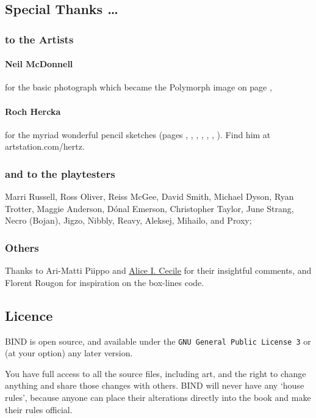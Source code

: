 \begin{multicols}{2}
\subsection*{Special Thanks \ldots}

\subsubsection*{to the Artists}

\paragraph{Neil McDonnell} for the basic photograph which became the Polymorph image on page \pageref{Roch_Hercka/polymorph},

\paragraph{Roch Hercka} for the myriad wonderful pencil sketches (pages 
\pageref{Roch_Hercka/dwarf_encumbrance}, 
\pageref{Roch_Hercka/stances}, 
\pageref{Roch_Hercka/vitals_shot}, 
\pageref{Roch_Hercka/conjuration_right}, 
\pageref{Roch_Hercka/polymorph}, 
\pageref{Roch_Hercka/dwarvish_runes}, 
\pageref{Roch_Hercka/flashing_light}
).
Find him at artstation.com/hertz.

\subsubsection*{and to the playtesters} Marri Russell, Ross Oliver, Reiss McGee, David Smith, Michael Dyson, Ryan Trotter, Maggie Anderson, 
D\'{o}nal Emerson, Christopher Taylor, June Strang, 
Necro (Bojan), Jigzo, Nibbly, Reavy, 
Aleksej, Mihailo, and Proxy;

\subsubsection*{Others}
Thanks to Ari-Matti Piippo and \href{https://www.twitter.com/AliceICecile}{Alice I. Cecile} for their insightful comments,
and Florent Rougon for inspiration on the box-lines code.

\subsection*{Licence}

BIND is open source, and available under the {\tt GNU General Public License 3} or (at your option) any later version.

You have full access to all the source files, including art, and the right to change anything and share those changes with others.
BIND will never have any `house rules', because anyone can place their alterations directly into the book and make their rules official.

\end{multicols}
